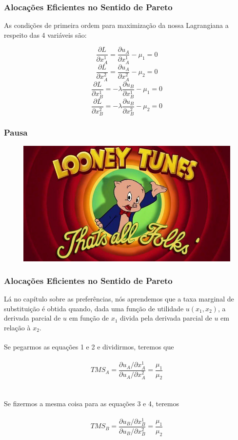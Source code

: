 \documentclass{beamer}[10]
\begin{document}
\begin{frame}
	\frametitle{Alocações Eficientes no Sentido de Pareto}

	As condições de primeira ordem para maximização da nossa Lagrangiana a respeito das 4 variáveis são:

	$$\frac{\partial L}{\partial x_A^1} = \frac{\partial u_A}{\partial x_A^1} - \mu_1 = 0$$
	$$\frac{\partial L}{\partial x_A^2} = \frac{\partial u_A}{\partial x_A^2} - \mu_2 = 0 $$
	$$\frac{\partial L}{\partial x_B^1} = -\lambda \frac{\partial u_B}{\partial x_B^1} - \mu_1 = 0 $$
	$$\frac{\partial L}{\partial x_B^2} = -\lambda \frac{\partial u_B}{\partial x_B^2} - \mu_2 = 0 $$

\end{frame}

\begin{frame}
	\frametitle{Pausa}

	\begin{figure}[H]
		\centering
		\colorbox{white}{\includegraphics[scale=0.425]{pausa.png}}
	\end{figure}		

\end{frame}


\begin{frame}
	\frametitle{Alocações Eficientes no Sentido de Pareto}

	Lá no capítulo sobre as preferências, nós aprendemos que a taxa marginal de substituição é obtida quando, dada uma função de utilidade $u(x_1,x_2)$, a derivada parcial de $u$ em função de $x_{1}$ divida pela derivada parcial de $u$ em relação à $x_{2}$.
	\\~\\
	Se pegarmos as equações 1 e 2 e dividirmos, teremos que
	\\~\\
	$$TMS_{A} = \frac{\partial u_A / \partial x_{A}^1 }{\partial u_A / \partial x_{A}^2} = \frac{\mu_{1} }{ \mu_{2} }$$
	\\~\\
	Se fizermos a mesma coisa para as equações 3 e 4, teremos
	\\~\\
	$$TMS_{B} = \frac{\partial u_B / \partial x_{B}^1 }{\partial u_B / \partial x_{B}^2} = \frac{\mu_{1} }{ \mu_{2} }$$

\end{frame}
\end{document}
